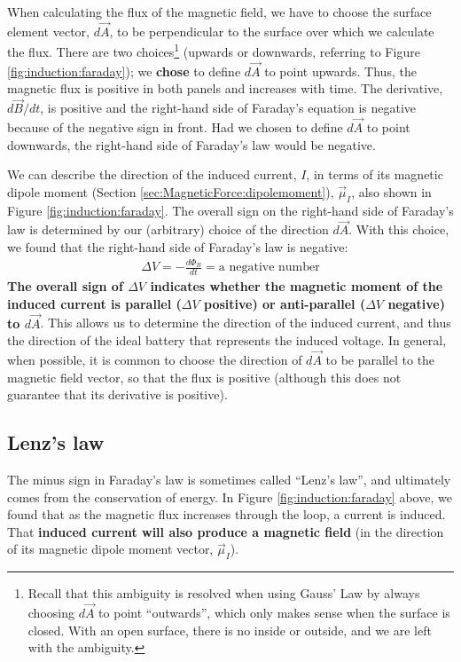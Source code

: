When calculating the flux of the magnetic field, we have to choose the surface element vector, $d\vec A$, to be perpendicular to the surface over which we calculate the flux. There are two choices\footnote{Recall that this ambiguity is resolved when using Gauss' Law by always choosing $d\vec A$ to point ``outwards'', which only makes sense when the surface is closed. With an open surface, there is no inside or outside, and we are left with the ambiguity.} (upwards or downwards, referring to Figure \ref{fig:induction:faraday}); we \textbf{chose} to define $d\vec A$ to point upwards. Thus, the magnetic flux is positive in both panels and increases with time. The derivative, $d\vec B/dt$, is positive and the right-hand side of Faraday's equation is negative because of the negative sign in front. Had we chosen to define $d\vec A$ to point downwards, the right-hand side of Faraday's law would be negative.

We can describe the direction of the induced current, $I$, in terms of its magnetic dipole moment (Section \ref{sec:MagneticForce:dipolemoment}), $\vec\mu_I$, also shown in Figure \ref{fig:induction:faraday}. The overall sign on the right-hand side of Faraday's law is determined by our (arbitrary) choice of the direction $d\vec A$. With this choice, we found that the right-hand side of Faraday's law is negative:
\begin{align*}
\Delta V = -\frac{d\Phi_B}{dt}=\text{a negative number}
\end{align*}
\textbf{The overall sign of $\Delta V$ indicates whether the magnetic moment of the induced current is parallel ($\Delta V$ positive) or anti-parallel ($\Delta V$ negative) to $d\vec A$}. This allows us to determine the direction of the induced current, and thus the direction of the ideal battery that represents the induced voltage. In general, when possible, it is common to choose the direction of $d\vec A$ to be parallel to the magnetic field vector, so that the flux is positive (although this does not guarantee that its derivative is positive).

\subsection{Lenz's law}
The minus sign in Faraday's law is sometimes called ``Lenz's law'', and ultimately comes from the conservation of energy. In Figure \ref{fig:induction:faraday} above, we found that as the magnetic flux increases through the loop, a current is induced. That \textbf{induced current will also produce a magnetic field} (in the direction of its magnetic dipole moment vector, $\vec \mu_I$).

